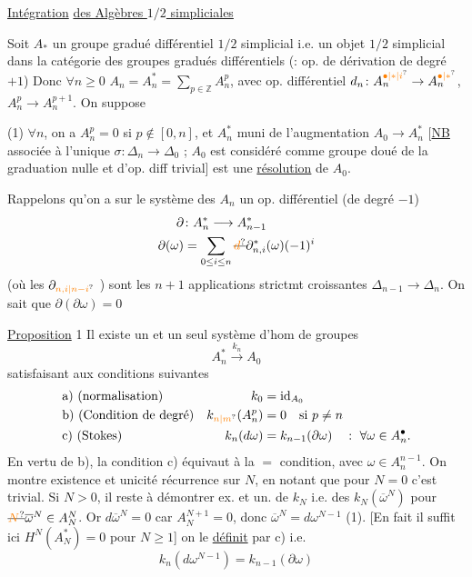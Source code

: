 \uline{Intégration} \uline{des Algèbres $1/2$ simpliciales}

Soit $A_*$ un groupe gradué différentiel $1/2$ simplicial i.e. un objet $1/2$ simplicial dans la catégorie des groupes gradués différentiels (: op. de dérivation de degré $+1$)  Donc $\forall n\geq0$ $A_n=A_n^*=\sum_{p\in\mathbb{Z}}A_n^p$, avec op. différentiel $d_n\colon A_n^{\unsure{\bullet|*|i}}\to A_n^{\unsure{\bullet|*}}$, $A_n^p\to A_n^{p+1}$. On suppose

(1) $\forall n$, on a $A_n^p=0$ si $p\notin[0,n]$, et  $A_n^*$ muni de l'augmentation  $A_0\to A_n^*$ [\uline{NB} associée à l'unique $\sigma\colon\Delta_n\to\Delta_0$ ; $A_0$ est considéré comme groupe doué de la graduation nulle et d'op. diff trivial] est une \uline{résolution} de $A_0$.

Rappelons qu'on a sur le système des $A_n$ un op. différentiel (de degré $-1$)
\[
\begin{aligned}
 \partial&\colon A_n^*\longrightarrow A_{n-1}^*\\
 \partial(\omega)&=\sum_{0\leq i\leq n}\deleted{\unsure{d}}\partial_{n,i}^*(\omega)(-1)^i
\end{aligned}
\]
(où les $\partial_{\unsure{n,i|n-i}}$ ) sont les $n+1$ applications strictmt croissantes $\Delta_{n-1}\to\Delta_n$. On sait que $\partial(\partial\omega)=0$

\uline{Proposition} 1 Il existe un et un seul système d'hom de groupes
\[
 A_n^*\xrightarrow{k_n}A_0
\]
satisfaisant aux conditions suivantes
\[
\begin{aligned}
 &\text{a) (normalisation)}& k_0&=\operatorname{id}_{A_0}\\
 &\text{b) (Condition de degré)}& k_{\unsure{n|m}}(A_n^p)&=0\quad\text{si }p\ne n\\
 &\text{c) (Stokes)}& k_n(d\omega)&=k_{n-1}(\partial\omega)\quad:\ \forall\omega\in A_n^\bullet.
\end{aligned}
\]
En vertu de b), la condition c) équivaut à la $=$ condition, avec $\omega\in A_n^{n-1}$. On montre existence et unicité   récurrence sur $N$, en notant que pour $N=0$ c'est trivial. Si $N>0$,  il reste à démontrer ex. et un. de $k_N$ i.e. des $k_N(\overline\omega^N)$ pour $\deleted{\unsure{N}}\overline\omega^N\in A_N^N$.
Or $d\overline\omega^N=0$  car $A_N^{N+1}=0$,  donc $\overline\omega^N=d\omega^{N-1}$ (1). [En fait il suffit ici  $H^N(A_N^*)=0$ pour $N\geq1$] on le \uline{définit} par c) i.e.
\[
 k_n(d\omega^{N-1})=k_{n-1}(\partial\omega)
\]

